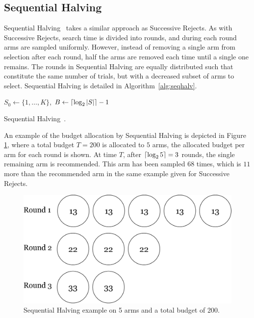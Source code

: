 \documentclass{kecsmstr}
\DeclarePairedDelimiter{\ceil}{\lceil}{\rceil}
\DeclarePairedDelimiter{\floor}{\lfloor}{\rfloor}
\begin{document}
\newpage

\subsection{Sequential Halving}
Sequential Halving~ takes a similar approach as Successive Rejects. As with Successive Rejects, search time is divided into rounds, and during each round arms are sampled uniformly. However, instead of removing a single arm from selection after each round, half the arms are removed each time until a single one remains. The rounds in Sequential Halving are equally distributed such that constitute the same number of trials, but with a decreased subset of arms to select. Sequential Halving is detailed in Algorithm~\ref{alg:seqhalv}.

\IncMargin{1em}
\begin{algorithm2e}[ht]
	\vspace{0.1cm}
	$S_0 \gets \{1,\dots,K\}$,
	$B \gets \ceil{\log_2{|S|}} - 1$														\;
	\BlankLine
  \caption[Sequential Halving]{Sequential Halving~\protect{}. \label{alg:seqhalv}}
\end{algorithm2e}
\DecMargin{1em}

An example of the budget allocation by Sequential Halving is depicted in Figure \ref{fig:seq-halving}, where a total budget $T = 200$ is allocated to $5$ arms, the allocated budget per arm for each round is shown. At time $T$, after $\ceil{\log_2{5}}=3$ rounds, the single remaining arm is recommended. This arm has been sampled $68$ times, which is $11$ more than the recommended arm in the same example given for Successive Rejects.

\begin{figure}[ht]
	\centering
	\includegraphics[width=.6\textwidth]{img/seq_halving.png}
	\caption{Sequential Halving example on 5 arms and a total budget of 200.}
	\label{fig:seq-halving}
\end{figure}
\end{document}
